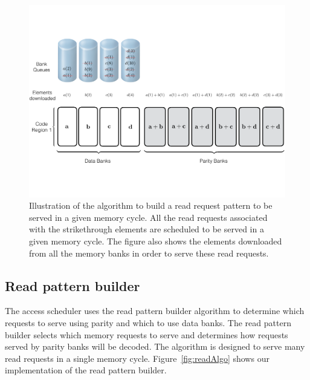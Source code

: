 \begin{figure}[htbp]
	\centering
	\includegraphics[width=0.96\linewidth]{fig/Read-Algo-Example.pdf}
	\caption{{Illustration of the algorithm to build a read request pattern to be served in a given memory cycle. All the read requests associated with the strikethrough elements are scheduled to be served in a given memory cycle. The figure also shows the elements downloaded from all the memory banks in order to serve these read requests.}}
	\label{fig:readAlgoAccessPattern}
\end{figure}
\subsection{Read pattern builder}
\label{sec:readCodingAlgo}


The access scheduler uses the read pattern builder algorithm to determine which requests to serve using parity and which to use data banks. The read pattern builder selects which memory requests to serve and determines how requests served by parity banks will be decoded. The algorithm is designed to serve many read requests in a single memory cycle. Figure~\ref{fig:readAlgo} shows our implementation of the read pattern builder.

